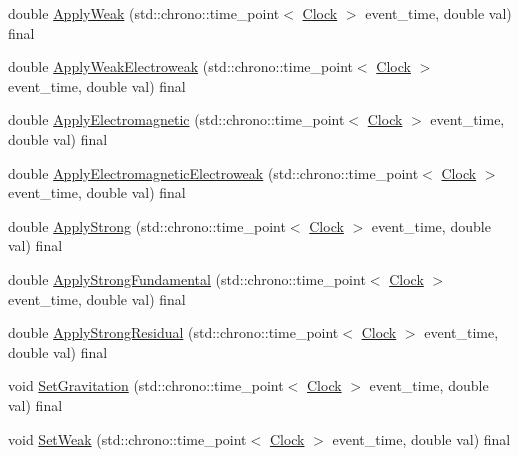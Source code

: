 \begin{DoxyCompactItemize}
\item 
double \mbox{\hyperlink{classLaw_a96ddd42403e3665c6070283ac201658d}{Apply\+Weak}} (std\+::chrono\+::time\+\_\+point$<$ \mbox{\hyperlink{universe_8h_a0ef8d951d1ca5ab3cfaf7ab4c7a6fd80}{Clock}} $>$ event\+\_\+time, double val) final
\item 
double \mbox{\hyperlink{classLaw_ae8a5d1d09686d79f7814c8800791460b}{Apply\+Weak\+Electroweak}} (std\+::chrono\+::time\+\_\+point$<$ \mbox{\hyperlink{universe_8h_a0ef8d951d1ca5ab3cfaf7ab4c7a6fd80}{Clock}} $>$ event\+\_\+time, double val) final
\item 
double \mbox{\hyperlink{classLaw_a418791aee2a9204a99d3a917b86fafd3}{Apply\+Electromagnetic}} (std\+::chrono\+::time\+\_\+point$<$ \mbox{\hyperlink{universe_8h_a0ef8d951d1ca5ab3cfaf7ab4c7a6fd80}{Clock}} $>$ event\+\_\+time, double val) final
\item 
double \mbox{\hyperlink{classLaw_a4485046db890a95cea16573042a4f4f6}{Apply\+Electromagnetic\+Electroweak}} (std\+::chrono\+::time\+\_\+point$<$ \mbox{\hyperlink{universe_8h_a0ef8d951d1ca5ab3cfaf7ab4c7a6fd80}{Clock}} $>$ event\+\_\+time, double val) final
\item 
double \mbox{\hyperlink{classLaw_ab38659b209055df7e59f4bcd1b9e545a}{Apply\+Strong}} (std\+::chrono\+::time\+\_\+point$<$ \mbox{\hyperlink{universe_8h_a0ef8d951d1ca5ab3cfaf7ab4c7a6fd80}{Clock}} $>$ event\+\_\+time, double val) final
\item 
double \mbox{\hyperlink{classLaw_a57d05f26e1c0ee953260ebd3780248f8}{Apply\+Strong\+Fundamental}} (std\+::chrono\+::time\+\_\+point$<$ \mbox{\hyperlink{universe_8h_a0ef8d951d1ca5ab3cfaf7ab4c7a6fd80}{Clock}} $>$ event\+\_\+time, double val) final
\item 
double \mbox{\hyperlink{classLaw_a266f86cdcc01e813249a2f192ab85eb3}{Apply\+Strong\+Residual}} (std\+::chrono\+::time\+\_\+point$<$ \mbox{\hyperlink{universe_8h_a0ef8d951d1ca5ab3cfaf7ab4c7a6fd80}{Clock}} $>$ event\+\_\+time, double val) final
\item 
void \mbox{\hyperlink{classLaw_a908ccc2b0a561a7324a15393ec157219}{Set\+Gravitation}} (std\+::chrono\+::time\+\_\+point$<$ \mbox{\hyperlink{universe_8h_a0ef8d951d1ca5ab3cfaf7ab4c7a6fd80}{Clock}} $>$ event\+\_\+time, double val) final
\item 
void \mbox{\hyperlink{classLaw_a1009b4e0bc0b91f41d48dc137529e97b}{Set\+Weak}} (std\+::chrono\+::time\+\_\+point$<$ \mbox{\hyperlink{universe_8h_a0ef8d951d1ca5ab3cfaf7ab4c7a6fd80}{Clock}} $>$ event\+\_\+time, double val) final
\item 

\end{DoxyCompactItemize}
